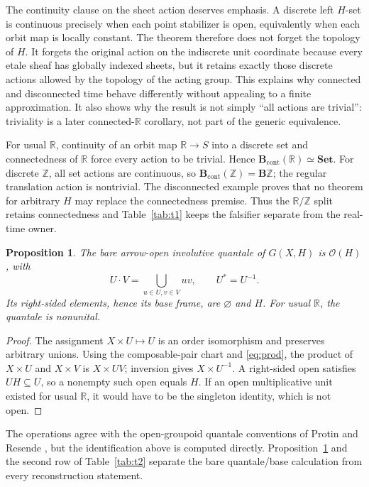\documentclass[12pt]{article}
\newtheorem{proposition}[theorem]{Proposition}
\theoremstyle{definition}
\newcommand{\B}{\mathbf B}
\newcommand{\Ocal}{\mathcal O}
\newcommand{\R}{\mathbb R}
\newcommand{\Z}{\mathbb Z}
\newcommand{\Set}{\mathbf{Set}}
\begin{document}
The continuity clause on the sheet action deserves emphasis.  A discrete left $H$-set is continuous precisely when each point stabilizer is open, equivalently when each orbit map is locally constant.  The theorem therefore does not forget the topology of $H$.  It forgets the original action on the indiscrete unit coordinate because every etale sheaf has globally indexed sheets, but it retains exactly those discrete actions allowed by the topology of the acting group.  This explains why connected and disconnected time behave differently without appealing to a finite approximation.  It also shows why the result is not simply ``all actions are trivial'': triviality is a later connected-$\R$ corollary, not part of the generic equivalence.

For usual $\R$, continuity of an orbit map $\R\to S$ into a discrete set and connectedness of $\R$ force every action to be trivial.  Hence $\B_{\mathrm{cont}}(\R)\simeq\Set$.  For discrete $\Z$, all set actions are continuous, so $\B_{\mathrm{cont}}(\Z)=\B\Z$; the regular translation action is nontrivial.  The disconnected example proves that no theorem for arbitrary $H$ may replace the connectedness premise.
Thus the $\R/\Z$ split retains connectedness and Table~\ref{tab:t1} keeps the falsifier separate from the real-time owner.

\begin{proposition}\label{prop:quantale}
The bare arrow-open involutive quantale of $G(X,H)$ is $\Ocal(H)$, with
\[
 U\cdot V=\bigcup_{u\in U,v\in V}uv,\qquad U^*=U^{-1}.
\]
Its right-sided elements, hence its base frame, are $\varnothing$ and $H$.  For usual $\R$, the quantale is nonunital.
\end{proposition}
\begin{proof}
The assignment $X\times U\mapsto U$ is an order isomorphism and preserves arbitrary unions.  Using the composable-pair chart and \eqref{eq:prod}, the product of $X\times U$ and $X\times V$ is $X\times UV$; inversion gives $X\times U^{-1}$.  A right-sided open satisfies $UH\subseteq U$, so a nonempty such open equals $H$.  If an open multiplicative unit existed for usual $\R$, it would have to be the singleton identity, which is not open.
\end{proof}
The operations agree with the open-groupoid quantale conventions of Protin and Resende \cite[printed pp.~203--205 and Theorem~2.41]{protinresende2012}, but the identification above is computed directly.
Proposition~\ref{prop:quantale} and the second row of Table~\ref{tab:t2} separate the bare quantale/base calculation from every reconstruction statement.
\end{document}
